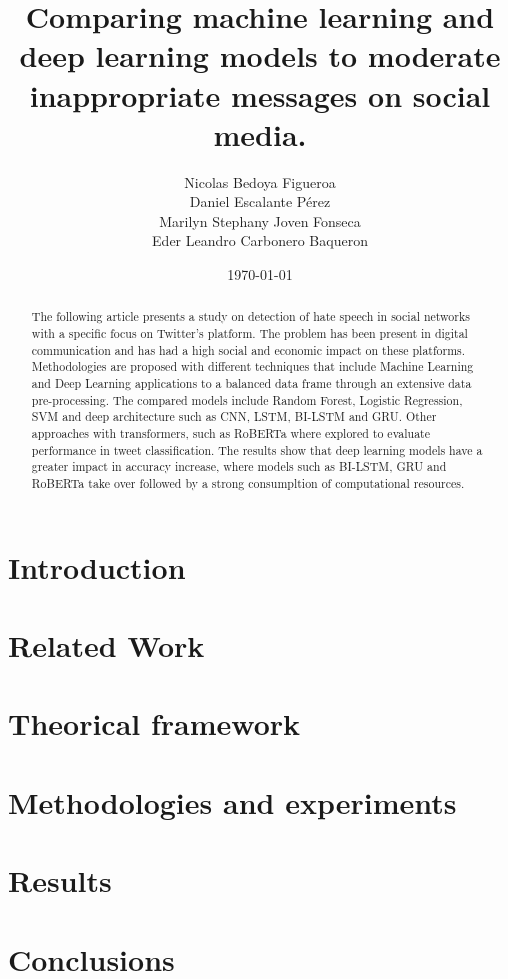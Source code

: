 \documentclass[conference]{IEEEtran}
\title{Comparing machine learning and deep learning models to moderate inappropriate messages on social media.}
\author{Nicolas Bedoya Figueroa \\
Daniel Escalante Pérez \\
Marilyn Stephany Joven Fonseca \\
Eder Leandro Carbonero Baqueron \\}
\date{\today}
\begin{document}
\maketitle
\begin{abstract}
The following article presents a study on detection of hate speech in social networks with a specific focus on Twitter's platform. The problem has been present in digital communication and has had a high social and economic impact on these platforms. Methodologies are proposed with different techniques that include Machine Learning and Deep Learning applications to a balanced data frame through an extensive data pre-processing. The compared models include Random Forest, Logistic Regression, SVM and deep architecture such as CNN, LSTM, BI-LSTM and GRU. Other approaches with transformers, such as RoBERTa where explored to evaluate performance in tweet classification. The results show that deep learning models have a greater impact in accuracy increase, where models such as BI-LSTM, GRU and RoBERTa take over followed by a strong consumpltion of computational resources.\end{abstract}

\section{Introduction}


\section{Related Work}


\section{Theorical framework}


\section{Methodologies and experiments}
\label{sec:methodologies}


\section{Results}


\section{Conclusions}




\end{document}

